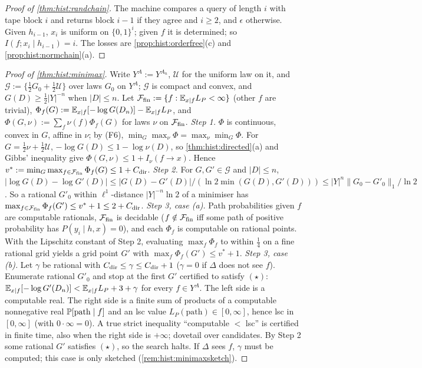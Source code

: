 \begin{proof}[Proof of \cref{thm:hist:randchain}]
The machine compares a query of length $i$ with tape block $i$ and returns block $i-1$ if they agree and $i\ge2$, and $\epsilon$ otherwise. Given $h_{i-1}$, $x_i$ is uniform on $\{0,1\}^i$; given $f$ it is determined; so $I(f;x_i\mid h_{i-1})=i$. The losses are \cref{prop:hist:orderfree}(c) and \cref{prop:hist:normchain}(a).
\end{proof}

\begin{proof}[Proof of \cref{thm:hist:minimax}]
Write $Y^A:=Y^{A_n}$, $\mathcal U$ for the uniform law on it, and $\mathcal G:=\{\frac12G_0+\frac12\mathcal U\}$ over laws $G_0$ on $Y^A$; $\mathcal G$ is compact and convex, and $G(D)\ge\frac12|Y|^{-n}$ when $|D|\le n$. Let $\mathcal F_{\rm fin}:=\{f:\mathbb{E}_{x\mid f}L_P<\infty\}$ (other $f$ are trivial), $\Phi_f(G):=\mathbb{E}_{x\mid f}[-\log G(D_n)]-\mathbb{E}_{x\mid f}L_P$, and $\Phi(G,\nu):=\sum_f\nu(f)\Phi_f(G)$ for laws $\nu$ on $\mathcal F_{\rm fin}$.
\emph{Step 1.} $\Phi$ is continuous, convex in $G$, affine in $\nu$; by (F6), $\min_G\max_\nu\Phi=\max_\nu\min_G\Phi$. For $G=\frac12\nu+\frac12\mathcal U$, $-\log G(D)\le1-\log\nu(D)$, so \cref{thm:hist:directed}(a) and Gibbs' inequality give $\Phi(G,\nu)\le1+I_\nu(f\to x)$. Hence $v^*:=\min_G\max_{f\in\mathcal F_{\rm fin}}\Phi_f(G)\le1+C_{\rm dir}$.
\emph{Step 2.} For $G,G'\in\mathcal G$ and $|D|\le n$, $|\log G(D)-\log G'(D)|\le|G(D)-G'(D)|/(\ln2\min(G(D),G'(D)))\le|Y|^n\|G_0-G'_0\|_1/\ln2$. So a rational $G'_0$ within $\ell^1$-distance $|Y|^{-n}\ln2$ of a minimiser has $\max_{f\in\mathcal F_{\rm fin}}\Phi_f(G')\le v^*+1\le2+C_{\rm dir}$.
\emph{Step 3, case (a).} Path probabilities given $f$ are computable rationals, $\mathcal F_{\rm fin}$ is decidable ($f\notin\mathcal F_{\rm fin}$ iff some path of positive probability has $P(y_i\mid h,x)=0$), and each $\Phi_f$ is computable on rational points. With the Lipschitz constant of Step 2, evaluating $\max_f\Phi_f$ to within $\frac14$ on a fine rational grid yields a grid point $G'$ with $\max_f\Phi_f(G')\le v^*+1$.
\emph{Step 3, case (b).} Let $\gamma$ be rational with $C_{\rm dir}\le\gamma\le C_{\rm dir}+1$ ($\gamma=0$ if $\Delta$ does not see $f$). Enumerate rational $G'_0$ and stop at the first $G'$ certified to satisfy $(\star)$: $\mathbb{E}_{x\mid f}[-\log G'(D_n)]<\mathbb{E}_{x\mid f}L_P+3+\gamma$ for every $f\in Y^A$. The left side is a computable real. The right side is a finite sum of products of a computable nonnegative real $\mathbb{P}[\text{path}\mid f]$ and an lsc value $L_P(\text{path})\in[0,\infty]$, hence lsc in $[0,\infty]$ (with $0\cdot\infty=0$). A true strict inequality ``computable $<$ lsc'' is certified in finite time, also when the right side is $+\infty$; dovetail over candidates. By Step 2 some rational $G'$ satisfies $(\star)$, so the search halts. If $\Delta$ sees $f$, $\gamma$ must be computed; this case is only sketched (\cref{rem:hist:minimaxsketch}).

\end{proof}
